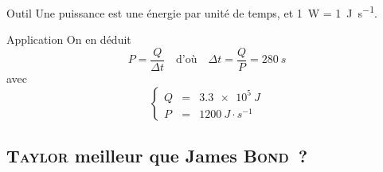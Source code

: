 \documentclass[a4paper, 12pt, final, garamond]{book}
\begin{document}
\begin{enumerate}
\begin{tcbraster}[raster columns=2, raster equal height=rows]
\begin{tcolorbox}[blankest, raster multicolumn=1, space to=\myspace]
\begin{tcbraster}[raster columns=1]
\begin{NCrapp}[]{Outil}
                        Une puissance est une énergie par unité de temps, et
                        \SI{1}{W} = \SI{1}{J.s^{-1}}.

                    \end{NCrapp}
                \end{tcbraster}
            \end{tcolorbox}
            \begin{NCexem}[raster multicolumn=1]{Application}
                On en déduit
                \[P = \frac{Q}{\Delta t}
                    \quad\text{d'où}\quad
                \boxed{\Delta t = \frac{Q}{P} = \SI{280}{s}}\]
                avec
                \[\left\{
                    \begin{array}{rcl}
                        Q & = & \SI{3.3e5}{J}\\
                        P & = & \SI{1200}{J⋅s^{-1}}
                    \end{array}
                \right.\]
            \end{NCexem}
        \end{tcbraster}
\end{enumerate}

\subsection{\textsc{Taylor} meilleur que James \textsc{Bond}~?}
\end{document}
